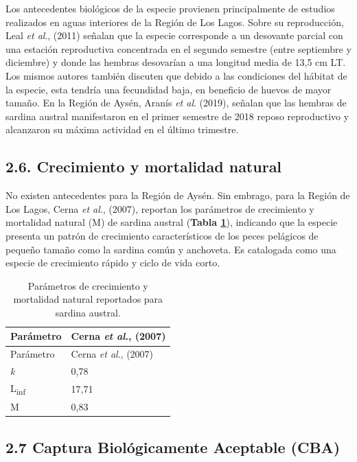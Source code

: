 \documentclass[
  spanish,
]{article}
\begin{document}
Los antecedentes biológicos de la especie provienen principalmente de
estudios realizados en aguas interiores de la Región de Los Lagos. Sobre
su reproducción, Leal \emph{et al}., (2011) señalan que la especie
corresponde a un desovante parcial con una estación reproductiva
concentrada en el segundo semestre (entre septiembre y diciembre) y
donde las hembras desovarían a una longitud media de 13,5 cm LT. Los
mismos autores también discuten que debido a las condiciones del hábitat
de la especie, esta tendría una fecundidad baja, en beneficio de huevos
de mayor tamaño. En la Región de Aysén, Aranís \emph{et al}. (2019),
señalan que las hembras de sardina austral manifestaron en el primer
semestre de 2018 reposo reproductivo y alcanzaron su máxima actividad en
el último trimestre.

\hypertarget{crecimiento-y-mortalidad-natural}{%
\subsection{2.6. Crecimiento y mortalidad
natural}\label{crecimiento-y-mortalidad-natural}}

No existen antecedentes para la Región de Aysén. Sin embrago, para la
Región de Los Lagos, Cerna \emph{et al}., (2007), reportan los
parámetros de crecimiento y mortalidad natural (M) de sardina austral
(\textbf{Tabla \ref{Tab1}}), indicando que la especie presenta un patrón
de crecimiento característicos de los peces pelágicos de pequeño tamaño
como la sardina común y anchoveta. Es catalogada como una especie de
crecimiento rápido y ciclo de vida corto.

\vspace{0.8cm}

\begin{longtable}[]{@{}ll@{}}
\caption{\label{Tab1} Parámetros de crecimiento y mortalidad natural
reportados para sardina austral.}\tabularnewline
\toprule
Parámetro & Cerna \emph{et al}., (2007)\tabularnewline
\midrule
\endfirsthead
\toprule
Parámetro & Cerna \emph{et al}., (2007)\tabularnewline
\midrule
\endhead
\emph{k} & 0,78\tabularnewline
L\textsubscript{inf} & 17,71\tabularnewline
M & 0,83\tabularnewline
\bottomrule
\end{longtable}

\hypertarget{captura-bioluxf3gicamente-aceptable-cba}{%
\subsection{2.7 Captura Biológicamente Aceptable
(CBA)}\label{captura-bioluxf3gicamente-aceptable-cba}}
\end{document}

